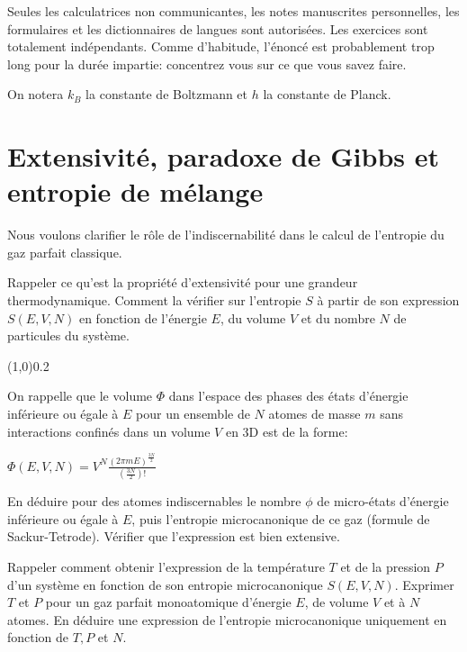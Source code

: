 \documentclass[utf8, 11pt]{feuille}
\begin{document}
Seules les calculatrices non communicantes, les notes manuscrites personnelles, les formulaires et les dictionnaires de langues sont autorisées. Les exercices sont totalement indépendants. Comme d'habitude, l'énoncé est probablement trop long pour la durée impartie: concentrez vous sur ce que vous savez faire.

On notera $k_B$ la constante de Boltzmann et $h$ la constante de Planck.





\section{Extensivité, paradoxe de Gibbs et entropie de mélange}

Nous voulons clarifier le rôle de l’indiscernabilité dans le calcul de l’entropie du gaz parfait classique.

\question Rappeler ce qu'est la propriété d’extensivité pour une grandeur thermodynamique. Comment la vérifier sur l'entropie $S$ à partir de son expression $S(E,V,N)$ en fonction de l'énergie $E$, du volume $V$ et du nombre $N$ de particules du système. 


\begin{center} \vspace{-0.5cm}\line(1,0){0.2\textwidth} \vspace{-0.5cm}\end{center}

On rappelle que  le volume $\Phi$ dans l'espace des phases des états d'énergie inférieure ou égale à $E$ pour un ensemble de $N$ atomes de masse $m$ sans interactions confinés dans un volume $V$ en 3D est de la forme:
\begin{center}
$\Phi(E,V,N)=V^N \frac{(2\pi m E)^\frac{3N}{2}}{(\frac{3N}{2})!}$    
\end{center}

\question En déduire pour des atomes indiscernables le nombre $\phi$ de micro-états d'énergie inférieure ou égale à $E$, puis l'entropie microcanonique de ce gaz (formule de Sackur-Tetrode). Vérifier que l'expression est bien extensive.

\question Rappeler comment obtenir l'expression de la température $T$ et de la pression $P$ d'un système en fonction de son entropie microcanonique $S(E, V, N)$.
Exprimer $T$ et $P$ pour un gaz parfait monoatomique d'énergie $E$, de volume $V$ et à $N$ atomes.
\question En déduire une expression de l'entropie microcanonique uniquement en fonction de $T, P$ et $N$.
\end{document}

